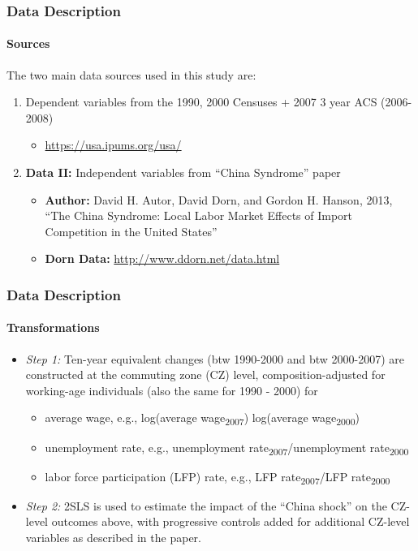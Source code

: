 \begin{frame}
    \frametitle{Data Description}
    \framesubtitle{Sources}
    The two main data sources used in this study are:
    \begin{enumerate}
        \item Dependent variables from the 1990, 2000 Censuses + 2007 3 year ACS (2006-2008)
        \begin{itemize}
            \item \url{https://usa.ipums.org/usa/}
        \end{itemize}
        \item \textbf{Data II:} Independent variables from “China Syndrome” paper
        \begin{itemize}
            \item \textbf{Author:} David H. Autor, David Dorn, and Gordon H. Hanson, 2013, “The China Syndrome: Local Labor Market Effects of Import Competition in the United States”
            \item \textbf{Dorn Data:} \url{http://www.ddorn.net/data.html}
        \end{itemize}
    \end{enumerate}
\end{frame}
\begin{frame}
    \frametitle{Data Description}
    \framesubtitle{Transformations}
    \begin{itemize}
        \item \textit{Step 1:} Ten-year equivalent changes (btw 1990-2000 and btw 2000-2007) are constructed at the commuting zone (CZ) level, composition-adjusted for working-age individuals (also the same for 1990 - 2000) for
        \begin{itemize}
            \item average wage, e.g., log(average wage\textsubscript{2007}) log(average wage\textsubscript{2000})
            \item unemployment rate, e.g., unemployment rate\textsubscript{2007}/unemployment rate\textsubscript{2000}
            \item labor force participation (LFP) rate, e.g., LFP rate\textsubscript{2007}/LFP rate\textsubscript{2000}
        \end{itemize}
        \item \textit{Step 2:} 2SLS is used to estimate the impact of the “China shock” on the CZ-level outcomes above, with progressive controls added for additional CZ-level variables as described in the paper.
    \end{itemize}
\end{frame}



